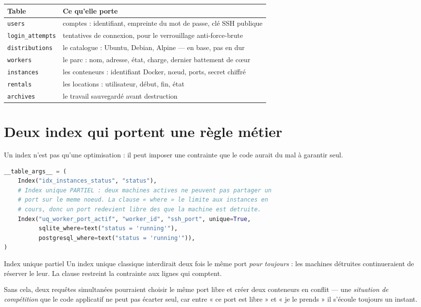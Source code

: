 \begin{center}
\small
\begin{tabularx}{\textwidth}{@{}lX@{}}
\toprule
\textbf{Table} & \textbf{Ce qu'elle porte} \\
\midrule
\texttt{users} & comptes : identifiant, empreinte du mot de passe, clé SSH publique \\
\texttt{login\_attempts} & tentatives de connexion, pour le verrouillage anti-force-brute \\
\texttt{distributions} & le catalogue : Ubuntu, Debian, Alpine --- en base, pas en dur \\
\texttt{workers} & le parc : nom, adresse, état, charge, dernier battement de cœur \\
\texttt{instances} & les conteneurs : identifiant Docker, nœud, ports, secret chiffré \\
\texttt{rentals} & les locations : utilisateur, début, fin, état \\
\texttt{archives} & le travail sauvegardé avant destruction \\
\bottomrule
\end{tabularx}
\end{center}

\section{Deux index qui portent une règle métier}

Un index n'est pas qu'une optimisation : il peut imposer une contrainte que le
code aurait du mal à garantir seul.

\begin{lstlisting}[language=Python,caption={\fichier{2\_webapp/models.py} --- l'unicité du port}]
__table_args__ = (
    Index("idx_instances_status", "status"),
    # Index unique PARTIEL : deux machines actives ne peuvent pas partager un
    # port sur le meme noeud. La clause « where » le limite aux instances en
    # cours, donc un port redevient libre des que la machine est detruite.
    Index("uq_worker_port_actif", "worker_id", "ssh_port", unique=True,
          sqlite_where=text("status = 'running'"),
          postgresql_where=text("status = 'running'")),
)
\end{lstlisting}

\begin{notion}{Index unique partiel}
Un index unique classique interdirait deux fois le même port \emph{pour
toujours} : les machines détruites continueraient de réserver le leur. La
clause  restreint la contrainte aux lignes qui comptent.

Sans cela, deux requêtes simultanées pourraient choisir le même port libre et
créer deux conteneurs en conflit --- une \emph{situation de compétition} que
le code applicatif ne peut pas écarter seul, car entre « ce port est libre »
et « je le prends » il s'écoule toujours un instant.
\end{notion}

